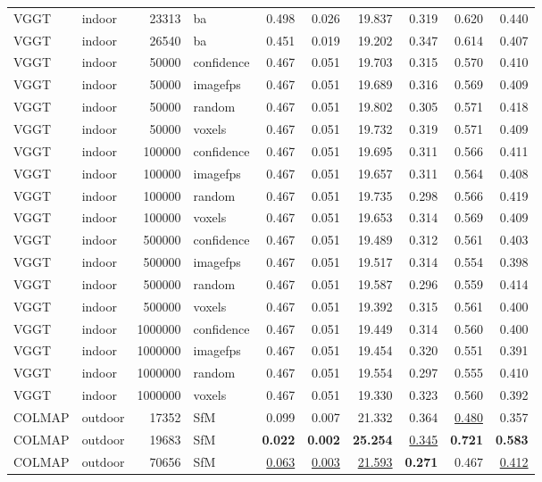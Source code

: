 \begin{table}[H]
\begin{tabular}{llrlrrrrrr}
VGGT & indoor & 23313 & ba & 0.498 & 0.026 & 19.837 & 0.319 & 0.620 & 0.440 \\
VGGT & indoor & 26540 & ba & 0.451 & 0.019 & 19.202 & 0.347 & 0.614 & 0.407 \\
VGGT & indoor & 50000 & confidence & 0.467 & 0.051 & 19.703 & 0.315 & 0.570 & 0.410 \\
VGGT & indoor & 50000 & imagefps & 0.467 & 0.051 & 19.689 & 0.316 & 0.569 & 0.409 \\
VGGT & indoor & 50000 & random & 0.467 & 0.051 & 19.802 & 0.305 & 0.571 & 0.418 \\
VGGT & indoor & 50000 & voxels & 0.467 & 0.051 & 19.732 & 0.319 & 0.571 & 0.409 \\
VGGT & indoor & 100000 & confidence & 0.467 & 0.051 & 19.695 & 0.311 & 0.566 & 0.411 \\
VGGT & indoor & 100000 & imagefps & 0.467 & 0.051 & 19.657 & 0.311 & 0.564 & 0.408 \\
VGGT & indoor & 100000 & random & 0.467 & 0.051 & 19.735 & 0.298 & 0.566 & 0.419 \\
VGGT & indoor & 100000 & voxels & 0.467 & 0.051 & 19.653 & 0.314 & 0.569 & 0.409 \\
VGGT & indoor & 500000 & confidence & 0.467 & 0.051 & 19.489 & 0.312 & 0.561 & 0.403 \\
VGGT & indoor & 500000 & imagefps & 0.467 & 0.051 & 19.517 & 0.314 & 0.554 & 0.398 \\
VGGT & indoor & 500000 & random & 0.467 & 0.051 & 19.587 & 0.296 & 0.559 & 0.414 \\
VGGT & indoor & 500000 & voxels & 0.467 & 0.051 & 19.392 & 0.315 & 0.561 & 0.400 \\
VGGT & indoor & 1000000 & confidence & 0.467 & 0.051 & 19.449 & 0.314 & 0.560 & 0.400 \\
VGGT & indoor & 1000000 & imagefps & 0.467 & 0.051 & 19.454 & 0.320 & 0.551 & 0.391 \\
VGGT & indoor & 1000000 & random & 0.467 & 0.051 & 19.554 & 0.297 & 0.555 & 0.410 \\
VGGT & indoor & 1000000 & voxels & 0.467 & 0.051 & 19.330 & 0.323 & 0.560 & 0.392 \\
\midrule
COLMAP & outdoor & 17352 & SfM & 0.099 & 0.007 & 21.332 & 0.364 & \underline{0.480} & 0.357 \\
COLMAP & outdoor & 19683 & SfM & \textbf{0.022} & \textbf{0.002} & \textbf{25.254} & \underline{0.345} & \textbf{0.721} & \textbf{0.583} \\
COLMAP & outdoor & 70656 & SfM & \underline{0.063} & \underline{0.003} & \underline{21.593} & \textbf{0.271} & 0.467 & \underline{0.412} \\

\end{tabular}
\end{table}
